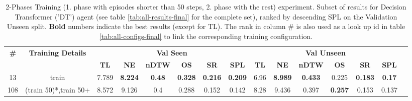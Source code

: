 \begin{table}
\centering
\caption{\label{tab:dt_split_training_50}2-Phases Training (1. phase with episodes shorter than 50 steps, 2. phase with the rest) experiment. Subset of results for Decision Transformer ('DT') agent (see table \ref{tab:all-results-final} for the complete set), ranked by descending SPL on the Validation Unseen split. \textbf{Bold} numbers indicate the best results (except for TL). The rank in column \# is also used as a look up id in table \ref{tab:all-configs-final} to link the corresponding training configuration.}
\begin{tabular}{@{\hskip3pt}c@{\hskip3pt}c@{\hskip3pt}c@{\hskip3pt}c@{\hskip3pt}c@{\hskip3pt}c@{\hskip3pt}c@{\hskip3pt}c@{\hskip3pt}c@{\hskip3pt}c@{\hskip3pt}c@{\hskip3pt}c@{\hskip3pt}c@{\hskip3pt}c@{\hskip3pt}c}
\toprule
                                  \textbf{\#} & \textbf{Training Details} & \multicolumn{6}{c}{\textbf{Val Seen}} & \multicolumn{6}{c}{\textbf{Val Unseen}} \\
\cmidrule(l){3-8}\cmidrule(l){9-14}\textbf{~} &                \textbf{~} &       \textbf{TL} &     \textbf{NE} &  \textbf{nDTW} &     \textbf{OS} &     \textbf{SR} &    \textbf{SPL} &         \textbf{TL} &     \textbf{NE} &   \textbf{nDTW} &     \textbf{OS} &     \textbf{SR} &   \textbf{SPL} \\
\midrule
                                           13 &                     train &             7.789 &  \textbf{8.224} &  \textbf{0.48} &  \textbf{0.328} &  \textbf{0.216} &  \textbf{0.209} &                6.96 &  \textbf{8.989} &  \textbf{0.433} &           0.225 &  \textbf{0.183} &  \textbf{0.17} \\
                                          108 &     (train 50)*,train 50+ &             8.572 &           9.126 &            0.4 &           0.288 &           0.152 &           0.142 &                8.28 &           9.436 &           0.397 &  \textbf{0.257} &           0.153 &          0.137 \\
\bottomrule
\end{tabular}
\end{table}

